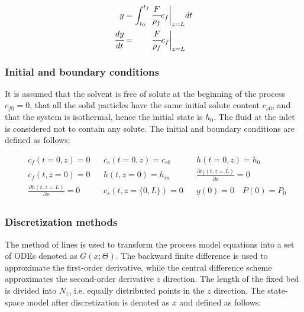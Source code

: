 \documentclass[../Article_Model_Parameters.tex]{subfiles}
\begin{document}
			{\footnotesize
				\begin{align} 
					\label{Model_measurment_1}
					y &= \int_{t_0}^{t_f} \cfrac{F}{\rho_f} c_f \biggr\rvert_{z=L} dt \\
					\cfrac{dy}{dt} &= \qquad \cfrac{F}{\rho_f} c_f \biggr\rvert_{z=L} 
					\label{Model_measurment_2}
			\end{align}	}
			
			\subsubsection{Initial and boundary conditions} 
			It is assumed that the solvent is free of solute at the beginning of the process $c_{f0}=0$, that all the solid particles have the same initial solute content $c_{s0}$, and that the system is isothermal, hence the initial state is $h_0$. The fluid at the inlet is considered not to contain any solute. The initial and boundary conditions are defined as follows:
			
			{\footnotesize
				\begin{align*}
					&c_f(t = 0, z) = 0  && c_s(t = 0, z) = c_{s0} && h(t = 0, z) = h_0 \\
					&c_f(t,   z=0) = 0  && h(t, z=0) = h_{in}  && \frac{\partial c_f(t,z=L)}{\partial x} = 0 \\
					&\frac{\partial h(t,z=L)}{\partial x} = 0   && c_s(t, z=\{0,L\}) = 0 && y(0) = 0 \quad P(0) = P_0 \\
			\end{align*} }
			
			\subsubsection{Discretization methods}
			
			The method of lines is used to transform the process model equations into a set of ODEs denoted as $G(x;\Theta)$. The backward finite difference is used to approximate the first-order derivative, while the central difference scheme approximates the second-order derivative $z$ direction. The length of the fixed bed is divided into $N_z$, i.e. equally distributed points in the $z$ direction. The state-space model after discretization is denoted as $x$ and defined as follows:
			
\end{document}
